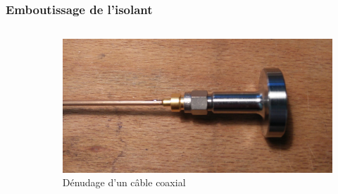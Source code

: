 \documentclass[8pt,a9paper]{beamer} \usepackage[utf8]{inputenc} \usepackage[francais]{babel} \usepackage[T1]{fontenc}
\begin{document}
\begin{frame}
\frametitle{Emboutissage de l'isolant}
\begin{columns}
\begin{column}{0.7\textwidth}
    \begin{description}
        \item[]~\\
    \end{description}
\end{column}
\begin{column}{0.3\textwidth}
\begin{figure}[h]
    \begin{center}
        \includegraphics[width=\textwidth]{Images/Coax/6}
        \caption{Dénudage d'un câble coaxial}
    \end{center}
\end{figure}
\end{column}
\end{columns}
\end{frame}
\end{document}
